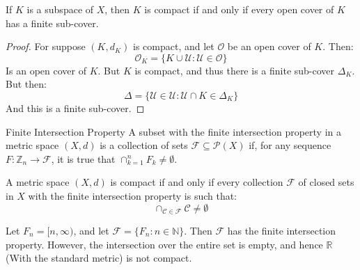 \documentclass[crop=false,class=article,oneside]{standalone}
\begin{document}
            \begin{theorem}
                If $K$ is a subspace of $X$, then $K$ is compact if and only
                if every open cover of $K$ has a finite sub-cover.
            \end{theorem}
            \begin{proof}
                For suppose $(K,d_{K})$ is compact, and let
                $\mathcal{O}$ be an open cover of $K$. Then:
                \begin{equation}
                    \mathcal{O}_{K}
                        =\{K\cup\mathcal{U}:\mathcal{U}\in\mathcal{O}\}
                \end{equation}
                Is an open cover of $K$. But $K$ is compact, and thus there is
                a finite sub-cover $\Delta_{K}$. But then:
                \begin{equation}
                    \Delta=\{\mathcal{U}\in\mathcal{U}:
                             \mathcal{U}\cap{K}\in\Delta_{K}\}
                \end{equation}
                And this is a finite sub-cover.
            \end{proof}
            \begin{ldefinition}{Finite Intersection Property}
                A subset with the finite intersection property in a metric
                space $(X,d)$ is a collection of sets
                $\mathscr{F}\subseteq\mathcal{P}(X)$ if, for any
                sequence $F:\mathbb{Z}_{n}\rightarrow\mathscr{F}$, 
                it is true that $\cap_{k=1}^{n}F_{k}\ne\emptyset$.
            \end{ldefinition}
            \begin{theorem}
                A metric space $(X,d)$ is compact if and only if every
                collection $\mathscr{F}$ of closed sets in $X$ with the
                finite intersection property is such that:
                \begin{equation}
                    \cap_{\mathcal{C}\in\mathcal{F}}\mathcal{C}\ne\emptyset
                \end{equation}
            \end{theorem}
            \begin{lexample}
                Let $F_{n}=[n,\infty)$, and let
                $\mathscr{F}=\{F_{n}:n\in\mathbb{N}\}$.
                Then $\mathscr{F}$ has the finite intersection property.
                However, the intersection over the entire set is empty, and
                hence $\mathbb{R}$ (With the standard metric) is not compact.
            \end{lexample}
\end{document}
